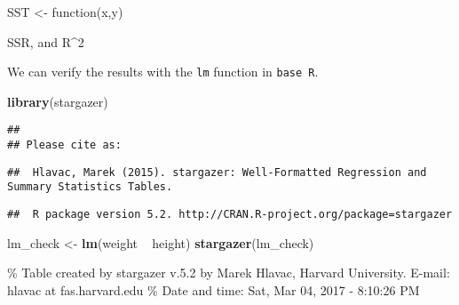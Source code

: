 \documentclass[]{article}
\newenvironment{Shaded}{\begin{snugshade}}{\end{snugshade}}
\newcommand{\KeywordTok}[1]{\textcolor[rgb]{0.13,0.29,0.53}{\textbf{{#1}}}}
\newcommand{\StringTok}[1]{\textcolor[rgb]{0.31,0.60,0.02}{{#1}}}
\newcommand{\NormalTok}[1]{{#1}}
\begin{document}
\begin{Shaded}
\begin{Highlighting}[]
\NormalTok{SST <-}\StringTok{ }\NormalTok{function(x,y)}
\end{Highlighting}
\end{Shaded}

SSR, and R\^{}2

We can verify the results with the \texttt{lm} function in
\texttt{base\ R}.

\begin{Shaded}
\begin{Highlighting}[]
\KeywordTok{library}\NormalTok{(stargazer)}
\end{Highlighting}
\end{Shaded}

\begin{verbatim}
## 
## Please cite as:
\end{verbatim}

\begin{verbatim}
##  Hlavac, Marek (2015). stargazer: Well-Formatted Regression and Summary Statistics Tables.
\end{verbatim}

\begin{verbatim}
##  R package version 5.2. http://CRAN.R-project.org/package=stargazer
\end{verbatim}

\begin{Shaded}
\begin{Highlighting}[]
\NormalTok{lm_check <-}\StringTok{ }\KeywordTok{lm}\NormalTok{(weight ~}\StringTok{ }\NormalTok{height)}
\KeywordTok{stargazer}\NormalTok{(lm_check)}
\end{Highlighting}
\end{Shaded}

\% Table created by stargazer v.5.2 by Marek Hlavac, Harvard University.
E-mail: hlavac at fas.harvard.edu \% Date and time: Sat, Mar 04, 2017 -
8:10:26 PM
\end{document}
